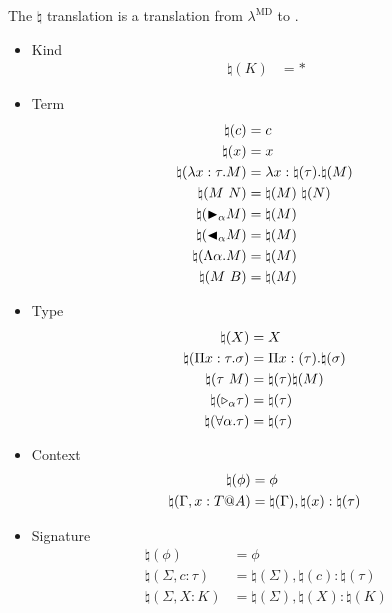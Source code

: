 \begin{definition}
    The $\natural$ translation is a translation from $\lambda^\text{MD}$ to .
    \begin{multicols}{2}
        \begin{itemize}
            \item Kind
                \begin{align*}
                    \natural(K) &= * &
                \end{align*}
            \item Term
                \begin{align*}
                    \natural(c) &= c & \\
                    \natural(x) &= x & \\
                    \natural(\lambda x:\tau.M) &= \lambda x:\natural(\tau).\natural(M) & \\
                    \natural(M\ N) &= \natural(M)\ \natural(N)& \\
                    \natural({\mathop{\blacktriangleright}}_\alpha M) &= \natural(M) & \\
                    \natural({\mathop{\blacktriangleleft}}_\alpha M) &= \natural(M)& \\
                    \natural(\Lambda\alpha.M) &= \natural(M)& \\
                    \natural(M\ B) &= \natural(M) &
                \end{align*}
            \item Type
            \begin{align*}
                \natural(X) &= X & \\
                \natural(\Pi x:\tau.\sigma) &= \Pi x:(\tau). \natural(\sigma) & \\
                \natural(\tau\ M) &= \natural(\tau) \natural(M) & \\
                \natural({\mathop{\triangleright}}_\alpha \tau) &= \natural(\tau) & \\
                \natural(\forall \alpha.\tau) &= \natural(\tau) &
            \end{align*}
        \item Context
            \begin{align*}
                \natural(\phi) &= \phi & \\
                \natural(\Gamma, x:T@A) &= \natural(\Gamma), \natural(x):\natural(\tau) & \\
            \end{align*}
        \item Signature
            \begin{align*}
                \natural(\phi) &= \phi & \\
                \natural(\Sigma, c:\tau) &= \natural(\Sigma),\natural(c):\natural(\tau) & \\
                \natural(\Sigma, X:K) &= \natural(\Sigma), \natural(X):\natural(K) &
            \end{align*}
    \end{itemize}
    \end{multicols}
\end{definition}

